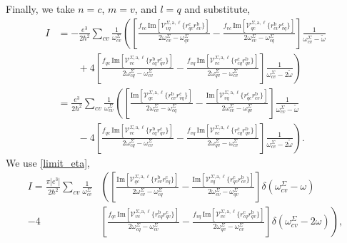 \documentclass[letterpaper,aps]{revtex4}
\begin{document}
Finally, we take $n = c$, $m = v$, and $l = q$ and substitute,
\begin{align*}
I &= -\frac{e^3}{2\hbar^2}\sum_{cv}\frac{1}{\omega^\Sigma_{cv}}
  \left(\left[
  \frac{f_{vc}\,\mathrm{Im}\left[\mathcal{V}^{\Sigma,\text{a},\ell}_{vq}
        \{r^{\text{c}}_{qc}
        r^{\text{b}}_{cv}\}\right]}
        {2\omega^\Sigma_{cv}-\omega^\Sigma_{qv}}
 -\frac{f_{vc}\,\mathrm{Im}\left[\mathcal{V}^{\Sigma,\text{a},\ell}_{qc}
        \{r^{\text{b}}_{cv}
        r^{\text{c}}_{vq}\}\right]}
        {2\omega^\Sigma_{cv}-\omega^\Sigma_{cq}}
\right]\frac{1}{\omega^\Sigma_{cv}-\tilde\omega}\right.\nonumber\\
&\qquad
+4\left.\left[
  \frac{f_{qc}\,\mathrm{Im}\left[\mathcal{V}^{\Sigma,\text{a},\ell}_{vc}
        \{r^{\text{b}}_{cq}
        r^{\text{c}}_{qv}\}\right]}
        {2\omega^\Sigma_{cq}-\omega^\Sigma_{cv}}
 -\frac{f_{vq}\,\mathrm{Im}\left[\mathcal{V}^{\Sigma,\text{a},\ell}_{vc}
        \{r^{\text{c}}_{cq}
        r^{\text{b}}_{qv}\}\right]}
        {2\omega^\Sigma_{qv}-\omega^\Sigma_{cv}}
\right]\frac{1}{\omega^\Sigma_{cv}-2\tilde\omega}\right)\nonumber\\
&= \frac{e^3}{2\hbar^2}\sum_{cv}\frac{1}{\omega^\Sigma_{cv}}
\left(\left[
 \frac{\mathrm{Im}\left[\mathcal{V}^{\Sigma,\text{a},\ell}_{qc}
        \{r^{\text{b}}_{cv}
        r^{\text{c}}_{vq}\}\right]}
        {2\omega^\Sigma_{cv}-\omega^\Sigma_{cq}}
 -\frac{\mathrm{Im}\left[\mathcal{V}^{\Sigma,\text{a},\ell}_{vq}
        \{r^{\text{c}}_{qc}
        r^{\text{b}}_{cv}\}\right]}
        {2\omega^\Sigma_{cv}-\omega^\Sigma_{qv}}
\right]\frac{1}{\omega^\Sigma_{cv}-\tilde\omega}\right.\nonumber\\
&\qquad-4
\left.\left[
  \frac{f_{qc}\,\mathrm{Im}\left[\mathcal{V}^{\Sigma,\text{a},\ell}_{vc}
        \{r^{\text{b}}_{cq}
        r^{\text{c}}_{qv}\}\right]}
        {2\omega^\Sigma_{cq}-\omega^\Sigma_{cv}}
 -\frac{f_{vq}\,\mathrm{Im}\left[\mathcal{V}^{\Sigma,\text{a},\ell}_{vc}
        \{r^{\text{c}}_{cq}
        r^{\text{b}}_{qv}\}\right]}
        {2\omega^\Sigma_{qv}-\omega^\Sigma_{cv}}
\right]\frac{1}{\omega^\Sigma_{cv}-2\tilde\omega}\right)
.
\end{align*}
We use \eqref{limit_eta},
\begin{align*}
I = \frac{\pi|e^3|}{2\hbar^2}\sum_{cv}\frac{1}{\omega^\Sigma_{cv}}
&\left(\left[
 \frac{\mathrm{Im}\left[\mathcal{V}^{\Sigma,\text{a},\ell}_{qc}
        \{r^{\text{b}}_{cv}
        r^{\text{c}}_{vq}\}\right]}
        {2\omega^\Sigma_{cv}-\omega^\Sigma_{cq}}
 -\frac{\mathrm{Im}\left[\mathcal{V}^{\Sigma,\text{a},\ell}_{vq}
        \{r^{\text{c}}_{qc}
        r^{\text{b}}_{cv}\}\right]}
        {2\omega^\Sigma_{cv}-\omega^\Sigma_{qv}}
\right]\delta(\omega^{\Sigma}_{cv}-\omega)\right.\nonumber\\
-
4&\left.\left[
  \frac{f_{qc}\,\mathrm{Im}\left[\mathcal{V}^{\Sigma,\text{a},\ell}_{vc}
        \{r^{\text{b}}_{cq}
        r^{\text{c}}_{qv}\}\right]}
        {2\omega^\Sigma_{cq}-\omega^\Sigma_{cv}}
 -\frac{f_{vq}\,\mathrm{Im}\left[\mathcal{V}^{\Sigma,\text{a},\ell}_{vc}
        \{r^{\text{c}}_{cq}
        r^{\text{b}}_{qv}\}\right]}
        {2\omega^\Sigma_{qv}-\omega^\Sigma_{cv}}
\right]\delta(\omega^{\Sigma}_{cv}-2\omega)\right)
,
\end{align*}
\end{document}
